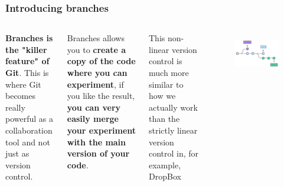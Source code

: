 \documentclass[aspectratio=169]{beamer} %
\begin{document}
\begin{frame}
\frametitle{Introducing branches}

	\begin{columns}[c]

		\textbf{Branches is the "killer feature" of Git}. This is where Git becomes really powerful as a collaboration tool and not just as version control.

		\vspace{.25cm}

		Branches allows you to \textbf{create a copy of the code where you can experiment}, if you like the result, \textbf{you can very easily merge your experiment with the main version of your code}.

		\vspace{.25cm}

		This non-linear version control is much more similar to how we actually work than the strictly linear version control in, for example, DropBox

		\begin{figure}
			\centering
			\includegraphics[width=1\linewidth]{../../Common-Resources/img/branches}
			\label{fig:branches}
		\end{figure}

	\end{columns}

\end{frame}
\end{document}
